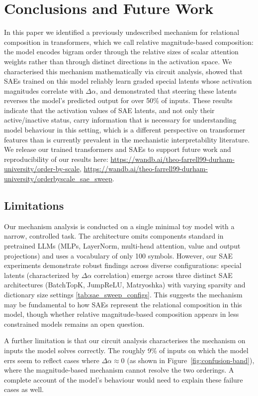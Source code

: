 \section{Conclusions and Future Work}

In this paper we identified a previously undescribed mechanism for relational composition in transformers, which we call relative magnitude-based composition: the model encodes bigram order through the relative sizes of scalar attention weights rather than through distinct directions in the activation space. 
We characterised this mechanism mathematically via circuit  analysis, showed that SAEs trained on this model reliably learn graded special latents whose activation magnitudes correlate with $\Delta\alpha$, and demonstrated that steering these latents reverses the model's predicted output for over 50\% of inputs. 
These results indicate that the activation values of SAE latents, and not only their active/inactive status, carry information that is necessary for understanding model behaviour in this setting, which is a different perspective on transformer features than is currently prevalent in the mechanistic interpretability literature.
We release our trained transformers and SAEs to support future work and reproducibility of our results here: \url{https://wandb.ai/theo-farrell99-durham-university/order-by-scale}, \url{https://wandb.ai/theo-farrell99-durham-university/orderbyscale_sae_sweep}.


\subsection*{Limitations}

Our mechanism analysis is conducted on a single minimal toy model with a narrow, controlled task. The architecture omits components standard in pretrained LLMs (MLPs, LayerNorm, multi-head attention, value and output projections) and uses a vocabulary of only 100 symbols. However, our SAE experiments demonstrate robust findings across diverse configurations: special latents (characterized by $\Delta\alpha$ correlation) emerge across three distinct SAE architectures (BatchTopK, JumpReLU, Matryoshka) with varying sparsity and dictionary size settings \ref{tab:sae_sweep_configs}. This suggests the mechanism may be fundamental to how SAEs represent the relational composition in this model, though whether relative magnitude-based composition appears in less constrained models remains an open question.

A further limitation is that our circuit analysis characterises the mechanism on inputs the model solves correctly. The roughly 9\% of inputs on which the model errs seem to reflect cases where $\Delta\alpha \approx 0$ (as shown in Figure~\ref{fig:confusion-band}), where the magnitude-based mechanism cannot resolve the two orderings. A complete account of the model's behaviour would need to explain these failure cases as well.

